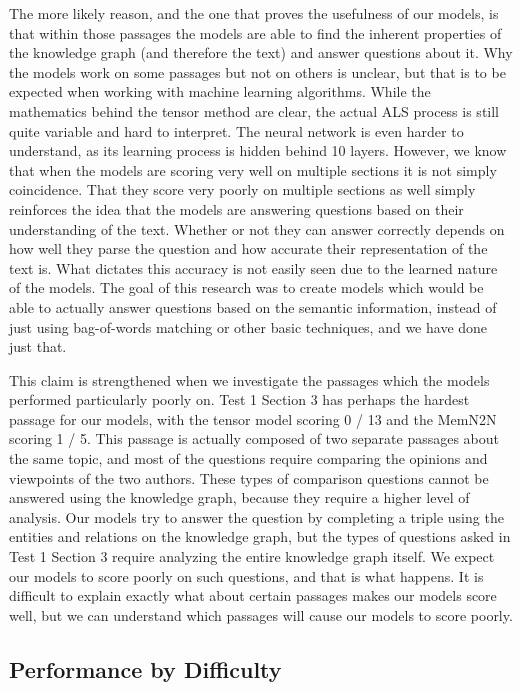 \documentclass[pageno]{jpaper}
\begin{document}
The more likely reason, and the one that proves the usefulness of our models, is
that within those passages the models are able to find the inherent properties
of the knowledge graph (and therefore the text) and answer questions about it.
Why the models work on some passages but not on others is unclear, but that is
to be expected when working with machine learning algorithms. While the
mathematics behind the tensor method are clear, the actual ALS process is still
quite variable and hard to interpret. The neural network is even harder to
understand, as its learning process is hidden behind 10 layers. However, we know
that when the models are scoring very well on multiple sections it is not simply
coincidence. That they score very poorly on multiple sections as well simply
reinforces the idea that the models are answering questions based on their
understanding of the text. Whether or not they can answer correctly depends on
how well they parse the question and how accurate their representation of the
text is. What dictates this accuracy is not easily seen due to the learned
nature of the models. The goal of this research was to create models which would
be able to actually answer questions based on the semantic information, instead
of just using bag-of-words matching or other basic techniques, and we have done
just that.

This claim is strengthened when we investigate the passages which the models
performed particularly poorly on. Test 1 Section 3 has perhaps the hardest
passage for our models, with the tensor model scoring 0 / 13 and the MemN2N
scoring 1 / 5. This passage is actually composed of two separate passages about
the same topic, and most of the questions require comparing the opinions and
viewpoints of the two authors. These types of comparison questions cannot be
answered using the knowledge graph, because they require a higher level of
analysis. Our models try to answer the question by completing a triple using the
entities and relations on the knowledge graph, but the types of questions asked
in Test 1 Section 3 require analyzing the entire knowledge graph itself. We
expect our models to score poorly on such questions, and that is what happens.
It is difficult to explain exactly what about certain passages makes our models
score well, but we can understand which passages will cause our models to score
poorly.

\subsection{Performance by Difficulty}
\label{Performance by Difficulty}
\end{document}
